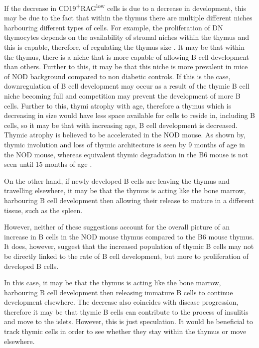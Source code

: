 If the decrease in CD19\textsuperscript{+}RAG\textsuperscript{low} cells is due to a decrease in development, this may be due to the fact that within the thymus there are multiple different niches harbouring different types of cells.
For example, the proliferation of DN thymocytes depends on the availability of stromal niches within the thymus and this is capable, therefore, of regulating the thymus size \citep{Prockop2004}.
It may be that within the thymus, there is a niche that is more capable of allowing B cell development than others.
Further to this, it may be that this niche is more prevalent in mice of NOD background compared to non diabetic controls.
If this is the case, downregulation of B cell development may occur as a result of the thymic B cell niche becoming full and competition may prevent the development of more B cells.
Further to this, thymi atrophy with age, therefore a thymus which is decreasing in size would have less space available for cells to reside in, including B cells, so it may be that with increasing age, B cell development is decreased. 
Thymic atrophy is believed to be accelerated in the NOD mouse.
As shown by, thymic involution and loss of thymic architecture is seen by 9 months of age in the NOD mouse, whereas equivalent thymic degradation in the B6 mouse is not seen until 15 months of age \citep{Ferreira2014}.

On the other hand, if newly developed B cells are leaving the thymus and travelling elsewhere, it may be that the thymus is acting like the bone marrow, harbouring B cell development then allowing their release to mature in a different tissue, such as the spleen.

However, neither of these suggestions account for the overall picture of an increase in B cells in the NOD mouse thymus compared to the B6 mouse thymus.
It does, however, suggest that the increased population of thymic B cells may not be directly linked to the rate of B cell development, but more to proliferation of developed B cells.

In this case, it may be that the thymus is acting like the bone marrow, harbouring B cell development then releasing immature B cells to continue development elsewhere.
The decrease also coincides with disease progression, therefore it may be that thymic B cells can contribute to the process of insulitis and move to the islets.
However, this is just speculation.
It would be beneficial to track thymic cells in order to see whether they stay within the thymus or move elsewhere.

